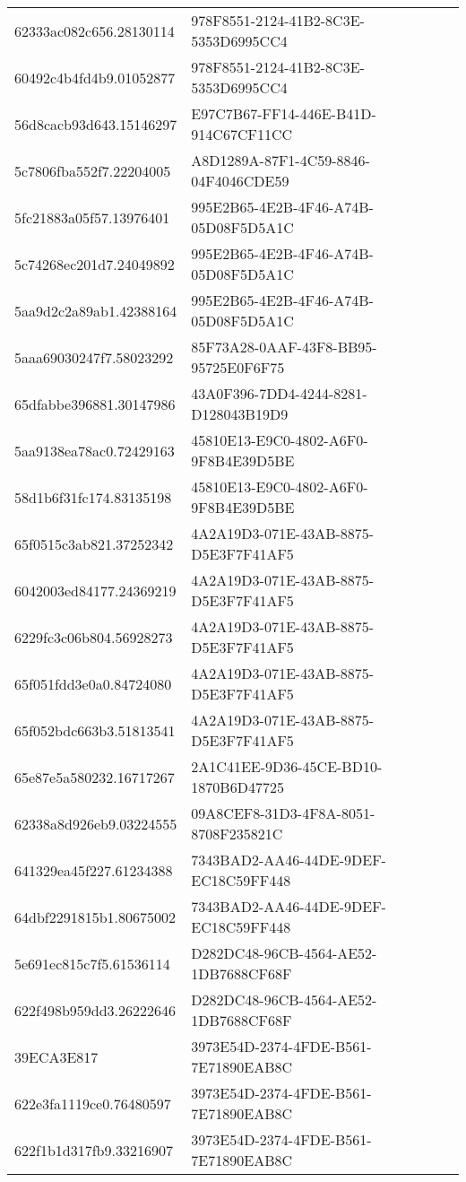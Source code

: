 \begin{tabular}{ll}
62333ac082c656.28130114 & 978F8551-2124-41B2-8C3E-5353D6995CC4 \\
60492c4b4fd4b9.01052877 & 978F8551-2124-41B2-8C3E-5353D6995CC4 \\
56d8cacb93d643.15146297 & E97C7B67-FF14-446E-B41D-914C67CF11CC \\
5c7806fba552f7.22204005 & A8D1289A-87F1-4C59-8846-04F4046CDE59 \\
5fc21883a05f57.13976401 & 995E2B65-4E2B-4F46-A74B-05D08F5D5A1C \\
5c74268ec201d7.24049892 & 995E2B65-4E2B-4F46-A74B-05D08F5D5A1C \\
5aa9d2c2a89ab1.42388164 & 995E2B65-4E2B-4F46-A74B-05D08F5D5A1C \\
5aaa69030247f7.58023292 & 85F73A28-0AAF-43F8-BB95-95725E0F6F75 \\
65dfabbe396881.30147986 & 43A0F396-7DD4-4244-8281-D128043B19D9 \\
5aa9138ea78ac0.72429163 & 45810E13-E9C0-4802-A6F0-9F8B4E39D5BE \\
58d1b6f31fc174.83135198 & 45810E13-E9C0-4802-A6F0-9F8B4E39D5BE \\
65f0515c3ab821.37252342 & 4A2A19D3-071E-43AB-8875-D5E3F7F41AF5 \\
6042003ed84177.24369219 & 4A2A19D3-071E-43AB-8875-D5E3F7F41AF5 \\
6229fc3c06b804.56928273 & 4A2A19D3-071E-43AB-8875-D5E3F7F41AF5 \\
65f051fdd3e0a0.84724080 & 4A2A19D3-071E-43AB-8875-D5E3F7F41AF5 \\
65f052bdc663b3.51813541 & 4A2A19D3-071E-43AB-8875-D5E3F7F41AF5 \\
65e87e5a580232.16717267 & 2A1C41EE-9D36-45CE-BD10-1870B6D47725 \\
62338a8d926eb9.03224555 & 09A8CEF8-31D3-4F8A-8051-8708F235821C \\
641329ea45f227.61234388 & 7343BAD2-AA46-44DE-9DEF-EC18C59FF448 \\
64dbf2291815b1.80675002 & 7343BAD2-AA46-44DE-9DEF-EC18C59FF448 \\
5e691ec815c7f5.61536114 & D282DC48-96CB-4564-AE52-1DB7688CF68F \\
622f498b959dd3.26222646 & D282DC48-96CB-4564-AE52-1DB7688CF68F \\
39ECA3E817 & 3973E54D-2374-4FDE-B561-7E71890EAB8C \\
622e3fa1119ce0.76480597 & 3973E54D-2374-4FDE-B561-7E71890EAB8C \\
622f1b1d317fb9.33216907 & 3973E54D-2374-4FDE-B561-7E71890EAB8C \\

\end{tabular}
